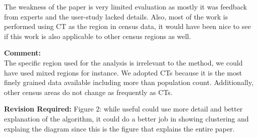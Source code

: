\documentclass{article}
\newcommand{\reply}[1]{\begin{tcolorbox}\noindent\textbf{Comment:}\\#1\hfill\end{tcolorbox}}
\begin{document}
\begin{itemize}
{    The weakness of the paper is very limited evaluation as mostly it was feedback
    from experts and the user-study lacked details. Also, most of the work is
    performed using CT as the region in census data, it would have been nice to see if
    this work is also applicable to other census regions as well.

    \reply{The specific region used for the analysis is irrelevant to the
    method, we could have used mixed regions for instance. We adopted CTs
    because it is the most finely grained data available including more than
    population count. Additionally, other census areas do not change as
    frequently as CTs. }

    \textbf{Revision Required:}
    Figure 2: while useful could use more detail and better explanation of the
    algorithm, it could do a better job in showing clustering and explaing the diagram
    since this is the figure that explains the entire paper.
}
\end{itemize}
\end{document}

